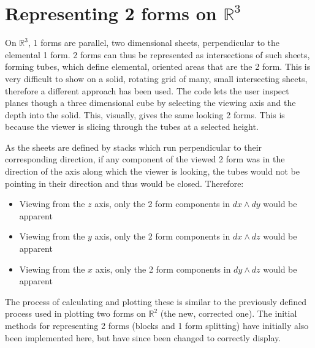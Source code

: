 \documentclass[12pt]{report}
\begin{document}
\section{Representing 2 forms on $\mathbb{R}^{3}$}
On $\mathbb{R}^{3}$, 1 forms are parallel, two dimensional sheets, perpendicular to the elemental 1 form. 2 forms can thus be represented as intersections of such sheets, forming tubes, which define elemental, oriented areas that are the 2 form. This is very difficult to show on a solid, rotating grid of many, small intersecting sheets, therefore a different approach has been used. The code lets the user inspect planes though a three dimensional cube by selecting the viewing axis and the depth into the solid.
This, visually, gives the same looking 2 forms. This is because the viewer is slicing through the tubes at a selected height.

As the sheets are defined by stacks which run perpendicular to their corresponding direction, if any component of the viewed 2 form was in the direction of the axis along which the viewer is looking, the tubes would not be pointing in their direction and thus would be closed. Therefore:
\begin{itemize}
	\item Viewing from the $z$ axis, only the 2 form components in $dx\wedge dy$ would be apparent
	\item Viewing from the $y$ axis, only the 2 form components in $dx\wedge dz$ would be apparent
	\item Viewing from the $x$ axis, only the 2 form components in $dy\wedge dz$ would be apparent
\end{itemize} 

The process of calculating and plotting these is similar to the previously defined process used in plotting two forms on $\mathbb{R}^{2}$ (the new, corrected one). The initial methods for representing 2 forms (blocks and 1 form splitting) have initially also been implemented here, but have since been changed to correctly display.
\end{document}

